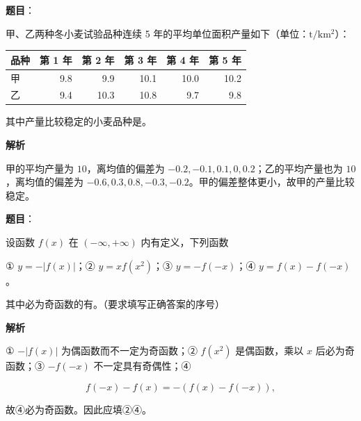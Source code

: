 \begin{answer}

\textbf{题目}：

甲、乙两种冬小麦试验品种连续 5 年的平均单位面积产量如下（单位：$\mathrm{t/km^2}$）：

\begin{center}
\begin{tabular}{lrrrrr}
\toprule
品种 & 第 1 年 & 第 2 年 & 第 3 年 & 第 4 年 & 第 5 年 \\
\midrule
甲 & 9.8 & 9.9 & 10.1 & 10.0 & 10.2 \\
乙 & 9.4 & 10.3 & 10.8 & 9.7 & 9.8 \\
\bottomrule
\end{tabular}
\end{center}

其中产量比较稳定的小麦品种是\gkblank{}。

\textbf{解析}

甲的平均产量为 $10$，离均值的偏差为 $-0.2,-0.1,0.1,0,0.2$；乙的平均产量也为 $10$，离均值的偏差为 $-0.6,0.3,0.8,-0.3,-0.2$。甲的偏差整体更小，故甲的产量比较稳定。


\end{answer}
\begin{answer}

\textbf{题目}：

设函数 $f(x)$ 在 $(-\infty,+\infty)$ 内有定义，下列函数

① $y=-|f(x)|$；② $y=xf(x^2)$；③ $y=-f(-x)$；④ $y=f(x)-f(-x)$。

其中必为奇函数的有\gkblank{}。（要求填写正确答案的序号）

\textbf{解析}

① $-|f(x)|$ 为偶函数而不一定为奇函数；② $f(x^2)$ 是偶函数，乘以 $x$ 后必为奇函数；③ $-f(-x)$ 不一定具有奇偶性；④

\nopagebreak[4]
\[
f(-x)-f(x)=-(f(x)-f(-x)),
\]

故④必为奇函数。因此应填②④。


\end{answer}

